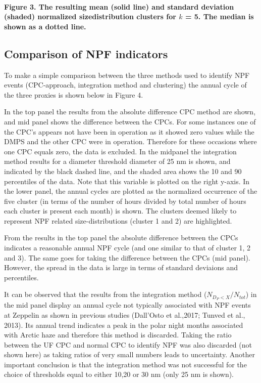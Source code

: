\documentclass[11pt]{article}
\begin{document}
    \begin{center}
    \end{center}
    { \hspace*{\fill} \\}
    
    \textbf{Figure 3. The resulting mean (solid line) and standard deviation
(shaded) normalized sizedistribution clusters for \(k\) = 5. The median
is shown as a dotted line.}

    \hypertarget{comparison-of-npf-indicators}{%
\subsection{Comparison of NPF
indicators}\label{comparison-of-npf-indicators}}

    To make a simple comparison between the three methods used to identify
NPF events (CPC-approach, integration method and clustering) the annual
cycle of the three proxies is shown below in Figure 4.

In the top panel the results from the absolute difference CPC method are
shown, and mid panel shows the difference between the CPCs. For some
instances one of the CPC's appears not have been in operation as it
showed zero values while the DMPS and the other CPC were in operation.
Therefore for these occasions where one CPC equals zero, the data is
excluded. In the midpanel the integration method results for a diameter
threshold diameter of 25 nm is shown, and indicated by the black dashed
line, and the shaded area shows the 10 and 90 percentiles of the data.
Note that this variable is plotted on the right y-axis. In the lower
panel, the annual cycles are plotted as the normalized occurrence of the
five cluster (in terms of the number of hours divided by total number of
hours each cluster is present each month) is shown. The clusters deemed
likely to represent NPF related size-distributions (cluster 1 and 2) are
highlighted.

From the results in the top panel the absolute difference between the
CPCs indicates a reasonable annual NPF cycle (and one similar to that of
cluster 1, 2 and 3). The same goes for taking the difference between the
CPCs (mid panel). However, the spread in the data is large in terms of
standard deviaions and percentiles.

It can be observed that the results from the integration method
(\(N_{D_P <X}/N_{tot}\)) in the mid panel display an annual cycle not
typically associated with NPF events at Zeppelin as shown in previous
studies (Dall'Osto et al.,2017; Tunved et al., 2013). Its annual trend
indicates a peak in the polar night months associated with Arctic haze
and therefore this method is discarded. Taking the ratio between the UF
CPC and normal CPC to identify NPF was also discarded (not shown here)
as taking ratios of very small numbers leads to uncertainty. Another
important conclusion is that the integration method was not successful
for the choice of thresholds equal to either 10,20 or 30 nm (only 25 nm
is shown).
\end{document}
